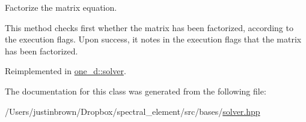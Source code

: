 Factorize the matrix equation. 



 This method checks first whether the matrix has been factorized, according to the execution flags. Upon success, it notes in the execution flags that the matrix has been factorized. 

Reimplemented in \hyperlink{classone__d_1_1solver_a33e9bc05b91b4da54ce783235447f334}{one\-\_\-d\-::solver}.



The documentation for this class was generated from the following file\-:\begin{DoxyCompactItemize}
\item 
/\-Users/justinbrown/\-Dropbox/spectral\-\_\-element/src/bases/\hyperlink{solver_8hpp}{solver.\-hpp}\end{DoxyCompactItemize}
